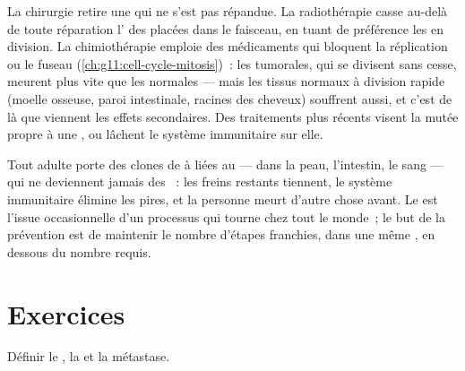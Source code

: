 \begin{example}\label{ex:g11:cancer:treatments}
La chirurgie retire une  qui ne s'est pas répandue. La
radiothérapie casse au-delà de toute réparation l' des 
placées dans le faisceau, en tuant de préférence les  en
division. La chimiothérapie emploie des médicaments qui bloquent la
réplication ou le fuseau (\cref{ch:g11:cell-cycle-mitosis})~: les
 tumorales, qui se divisent sans cesse, meurent plus vite que
les  normales --- mais les tissus normaux à division rapide
(moelle osseuse, paroi intestinale, racines des cheveux) souffrent
aussi, et c'est de là que viennent les effets secondaires. Des
traitements plus récents visent la  mutée propre à une ,
ou lâchent le système immunitaire sur elle.
\end{example}

\begin{remark}\label{rem:g11:cancer:everyone}
Tout adulte porte des clones de  à  liées au 
--- dans la peau, l'intestin, le sang --- qui ne deviennent jamais des
~: les freins restants tiennent, le système immunitaire élimine
les pires, et la personne meurt d'autre chose avant. Le  est
l'issue occasionnelle d'un processus qui tourne chez tout le monde~; le
but de la prévention est de maintenir le nombre d'étapes franchies,
dans une même , en dessous du nombre requis.
\end{remark}

\section{Exercices}

\begin{exercise}[$\star$]\label{exo:g11:cancer:1}
Définir le , la  et la métastase.
\end{exercise}

